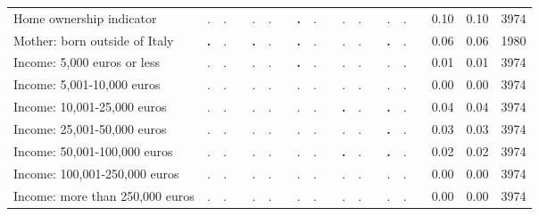\begin{tabular}{l c c c c c c c c c c c c c c c c c c}
Home ownership indicator &         . &         . & &         . &         . & & \textbf{        .} &         . & &         . &         . & &         . &         . & &      0.10 &      0.10 &      3974 \\
Mother: born outside of Italy & \textbf{        .} &         . & & \textbf{        .} &         . & & \textbf{        .} &         . & &         . &         . & & \textbf{        .} &         . & &      0.06 &      0.06 &      1980 \\
Income: 5,000 euros or less &         . &         . & &         . &         . & & \textbf{        .} &         . & &         . &         . & &         . &         . & &      0.01 &      0.01 &      3974 \\
Income: 5,001-10,000 euros &         . &         . & &         . &         . & &         . &         . & &         . &         . & &         . &         . & &      0.00 &      0.00 &      3974 \\
Income: 10,001-25,000 euros &         . &         . & &         . &         . & &         . &         . & & \textbf{        .} &         . & & \textbf{        .} &         . & &      0.04 &      0.04 &      3974 \\
Income: 25,001-50,000 euros &         . &         . & &         . &         . & &         . &         . & &         . &         . & & \textbf{        .} &         . & &      0.03 &      0.03 &      3974 \\
Income: 50,001-100,000 euros &         . &         . & &         . &         . & &         . &         . & & \textbf{        .} &         . & & \textbf{        .} &         . & &      0.02 &      0.02 &      3974 \\
Income: 100,001-250,000 euros &         . &         . & &         . &         . & &         . &         . & &         . &         . & &         . &         . & &      0.00 &      0.00 &      3974 \\
Income: more than 250,000 euros &         . &         . & &         . &         . & &         . &         . & &         . &         . & &         . &         . & &      0.00 &      0.00 &      3974 \\
\bottomrule
\end{tabular}
